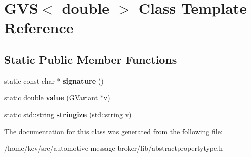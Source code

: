 \hypertarget{classGVS_3_01double_01_4}{\section{G\+V\+S$<$ double $>$ Class Template Reference}
\label{classGVS_3_01double_01_4}
}
\subsection*{Static Public Member Functions}
\begin{DoxyCompactItemize}
\item 
\hypertarget{classGVS_3_01double_01_4_a995d18f59b8a60af292ecb4778378f6a}{static const char $\ast$ {\bfseries signature} ()}\label{classGVS_3_01double_01_4_a995d18f59b8a60af292ecb4778378f6a}

\item 
\hypertarget{classGVS_3_01double_01_4_ab60f061e68f1e60367f62057a0549160}{static double {\bfseries value} (G\+Variant $\ast$v)}\label{classGVS_3_01double_01_4_ab60f061e68f1e60367f62057a0549160}

\item 
\hypertarget{classGVS_3_01double_01_4_aee0d8fdc467f97da7b072b1caa34b694}{static std\+::string {\bfseries stringize} (std\+::string v)}\label{classGVS_3_01double_01_4_aee0d8fdc467f97da7b072b1caa34b694}

\end{DoxyCompactItemize}


The documentation for this class was generated from the following file\+:\begin{DoxyCompactItemize}
\item 
/home/kev/src/automotive-\/message-\/broker/lib/abstractpropertytype.\+h\end{DoxyCompactItemize}
